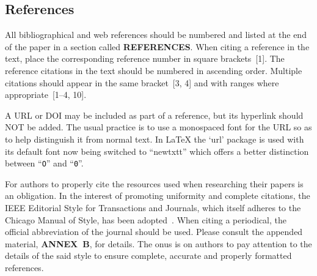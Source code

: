 \documentclass[a4paper,
               nospread,     %
               ]{jacow}
\begin{document}
\subsection{References}
%
%
All bibliographical and web references should be numbered and listed at the
end of the paper in a section called \textbf{REFERENCES}. When citing a
reference in the text, place the corresponding reference number in square
brackets~[1]. The reference citations in the text should be numbered
in ascending order. Multiple citations should appear in
the same bracket~[3, 4] and
with ranges where appropriate~[1--4, 10].

A URL or DOI may be included as part of a reference, but its
hyperlink should NOT be added. The usual practice is to
use a monospaced font for the URL so as to help distinguish
it from normal text. In \LaTeX{} the ‘url’ package is used with its 
default font now being switched to ``newtxtt'' which offers
a better distinction between ``\texttt{O}'' and ``\texttt{0}''.

For authors to properly cite the resources used when researching
their papers is an obligation. In the interest of
promoting uniformity and complete citations, the IEEE
Editorial Style for Transactions and Journals, which itself 
adheres to the Chicago Manual of Style, has been adopted~\cite{IEEE}. 
When citing a periodical, the official abbreviation of the journal 
should be used\cite{journal-abbreviations}.
Please consult the appended material, \textbf{ANNEX~B},
for details. The onus is on authors to pay attention to
the details of the said style to ensure complete, accurate
and properly formatted references.
\end{document}
